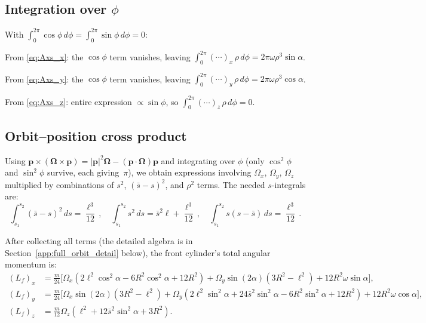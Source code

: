 \documentclass[11pt]{article}
\newcommand{\vect}[1]{\bm{#1}}
\begin{document}
\subsection{Integration over $\phi$}

With $\int_0^{2\pi}\cos\phi\,d\phi=\int_0^{2\pi}\sin\phi\,d\phi=0$:

From \eqref{eq:Axs_x}: the $\cos\phi$ term vanishes, leaving
$\int_0^{2\pi}(\cdots)_x\,\rho\,d\phi = 2\pi\omega\rho^3\sin\alpha$.

From \eqref{eq:Axs_y}: the $\cos\phi$ term vanishes, leaving
$\int_0^{2\pi}(\cdots)_y\,\rho\,d\phi = 2\pi\omega\rho^3\cos\alpha$.

From \eqref{eq:Axs_z}: entire expression $\propto\sin\phi$, so
$\int_0^{2\pi}(\cdots)_z\,\rho\,d\phi = 0$.

\subsection{Orbit--position cross product}

Using $\vect{p}\times(\vect{\Omega}\times\vect{p})
=|\vect{p}|^2\vect{\Omega}-(\vect{p}\cdot\vect{\Omega})\vect{p}$
and integrating over $\phi$ (only $\cos^2\!\phi$ and $\sin^2\!\phi$
survive, each giving~$\pi$), we obtain expressions involving
$\Omega_x$, $\Omega_y$, $\Omega_z$ multiplied by combinations
of $s^2$, $(\bar{s}-s)^2$, and $\rho^2$ terms.  The needed
$s$-integrals are:
\begin{equation}
\int_{s_1}^{s_2}(\bar{s}-s)^2\,ds = \frac{\ell^3}{12}\,,\quad
\int_{s_1}^{s_2}s^2\,ds = \bar{s}^2\ell+\frac{\ell^3}{12}\,,\quad
\int_{s_1}^{s_2}s(s-\bar{s})\,ds = \frac{\ell^3}{12}\,.
\end{equation}

After collecting all terms (the detailed algebra is in
Section~\ref{app:full_orbit_detail} below), the front cylinder's total
angular momentum is:
\begin{align}
(L_f)_x &= \frac{m}{24}\bigl[
  \Omega_x(2\ell^2\cos^2\!\alpha-6R^2\cos^2\!\alpha+12R^2)
  +\Omega_y\sin(2\alpha)(3R^2-\ell^2)
  +12R^2\omega\sin\alpha\bigr], \label{eq:ALfx}\\
(L_f)_y &= \frac{m}{24}\bigl[
  \Omega_x\sin(2\alpha)(3R^2-\ell^2)
  +\Omega_y(2\ell^2\sin^2\!\alpha+24\bar{s}^2\sin^2\!\alpha
  -6R^2\sin^2\!\alpha+12R^2)
  +12R^2\omega\cos\alpha\bigr], \label{eq:ALfy}\\
(L_f)_z &= \frac{m}{12}\Omega_z(\ell^2+12\bar{s}^2\sin^2\!\alpha+3R^2).
  \label{eq:ALfz}
\end{align}
\end{document}

